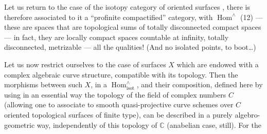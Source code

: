 Let us return to the case of the isotopy category
of oriented  surfaces , there is therefore
associated to it a ``profinite compactified'' category,
with $\operatorname{Hom}^{\wedge}$  (12) --- these are
spaces that are topological sums of totally disconnected
compact spaces --- in fact, they are
locally compact spaces countable at infinity,
totally disconnected, metrizable --- all
the qualities! (And no isolated points, to
boot\ldots)

Let us now restrict ourselves to the case of
surfaces $X$ which are endowed with a complex
algebraic curve structure, compatible with its
topology. Then the morphisms between such
$X$, in a $\operatorname{Hom}^{\wedge}_{\mathrm{isot}}$, and their composition,
defined here by using in an essential way
the topology of the field of complex numbers $C$
(allowing one to associate to smooth quasi-projective
curve schemes over $C$ oriented
topological surfaces of finite type), can be
described in a purely algebro-geometric
way, independently of this topology
of $\mathbb C$ (anabelian case, still). For the
